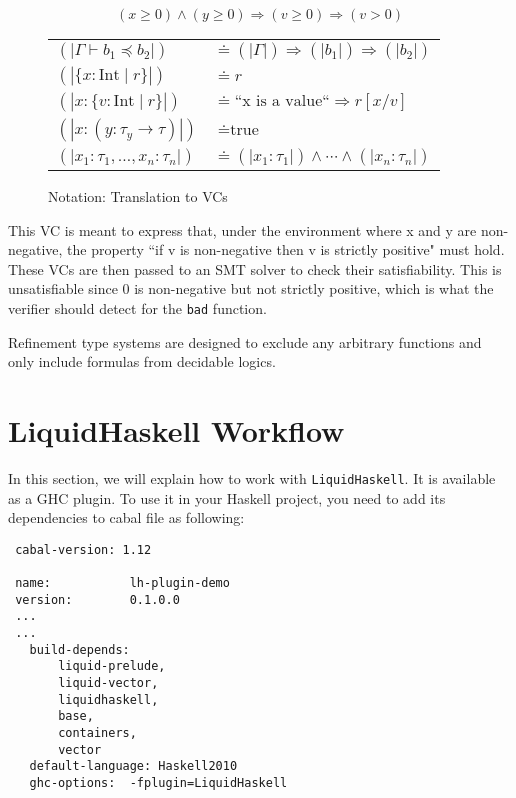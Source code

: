 \begin{equation}
	\label{eq:subtyping-vc}
	(x \ge 0) \land (y \ge 0)  \Rightarrow (v \ge 0) \Rightarrow (v > 0)
\end{equation}
\begin{figure}[htbp]
	\centering
	\renewcommand{\arraystretch}{1.4}
	\begin{tabular}{@{}ll@{}}
		\( (|\Gamma \vdash b_1 \preceq b_2|) \) & \( \doteq (|\Gamma|) \Rightarrow (|b_1|) \Rightarrow (|b_2|) \) \\[1ex]
		\( (|\{x:\mathrm{Int} \mid r\}|) \)     & \( \doteq r \)                                                  \\[1ex]
		\( (|x:\{v:\mathrm{Int} \mid r\}|) \)   & \( \doteq \text{``x is a value``} \Rightarrow r[x/v] \)         \\[1ex]
		\( (|x:(y:\tau_y \to \tau)|) \)         & \( \doteq \text{true} \)                                        \\[1ex]
		\( (|x_1:\tau_1,\ldots,x_n:\tau_n|) \)  & \( \doteq (|x_1:\tau_1|) \land \cdots \land (|x_n:\tau_n|) \)
	\end{tabular}
	\caption{Notation: Translation to VCs \cite{vazou2014}}
	\label{fig:notation}
\end{figure}

This VC is meant to express that, under the environment where x and y are non-negative,
the property “if v is non-negative then v is strictly positive" must hold.
These VCs are then passed to an SMT solver to check their satisfiability.
This is unsatisfiable since 0 is non-negative but not strictly positive,
which is what the verifier should detect for the \texttt{bad} function.

Refinement type systems are designed to exclude any arbitrary functions and only include formulas
from decidable logics\cite{vazou2014}.
\section { LiquidHaskell  Workflow }
\label{sec:workflow}

In this section, we will explain how to work with \texttt{LiquidHaskell}.
It is available as a GHC plugin.
To use it in your Haskell project, you need to add its dependencies to cabal file as following:

\vspace{1em}
\begin{lstlisting}
 cabal-version: 1.12

 name:           lh-plugin-demo
 version:        0.1.0.0
 ...
 ...
   build-depends:
       liquid-prelude,
       liquid-vector,
       liquidhaskell,
       base,
       containers,
       vector
   default-language: Haskell2010
   ghc-options:  -fplugin=LiquidHaskell
\end{lstlisting}
\vspace{1em}

